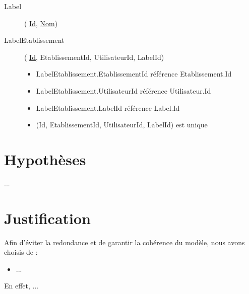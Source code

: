 \documentclass[10pt,a4paper]{article}
\begin{document}
\begin{description}
\item[Label](
    \underline{Id},
    \underline{Nom})

\item[LabelEtablissement](
    \underline{Id},
    EtablissementId,
    UtilisateurId,
    LabelId)

    \begin{itemize}
        \item LabelEtablissement.EtablissementId référence Etablissement.Id
        \item LabelEtablissement.UtilisateurId référence Utilisateur.Id
        \item LabelEtablissement.LabelId référence Label.Id
        \item (Id, EtablissementId, UtilisateurId, LabelId) est unique
    \end{itemize}

\end{description}

\section{Hypothèses}

...

\section{Justification}

Afin d'éviter la redondance et de garantir la cohérence du modèle, nous avons choisis de :
\begin{itemize}
  \item ...
\end{itemize}
En effet, ...
\end{document}
